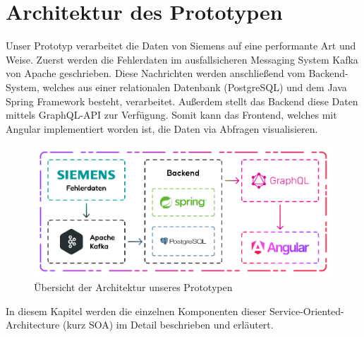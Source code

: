 \chapter{Architektur des Prototypen}
\label{chp:architecture}




Unser Prototyp verarbeitet die Daten von Siemens auf eine performante Art und Weise. Zuerst werden die Fehlerdaten im ausfallsicheren Messaging System Kafka von Apache geschrieben. Diese Nachrichten werden anschließend vom Backend-System, welches aus einer relationalen Datenbank (PostgreSQL) und dem Java Spring Framework besteht, verarbeitet. Außerdem stellt das Backend diese Daten mittels GraphQL-API zur Verfügung. Somit kann das Frontend, welches mit Angular implementiert worden ist, die Daten via Abfragen visualisieren.

\begin{figure}
    \centering
    \includegraphics[width=1\textwidth]{content/img/Architecture/Architecture.jpg}
    \caption{Übersicht der Architektur unseres Prototypen}
    \label{fig:OverviewArchitektur}
\end{figure}

In diesem Kapitel werden die einzelnen Komponenten dieser Service-Oriented-Architecture (kurz SOA) im Detail beschrieben und erläutert.


\newpage
